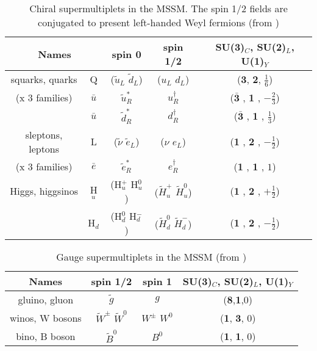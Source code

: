\begin{table}[h]
	\centering
	\begin{tabular}{|c|c|c|c|c|}\hline
\multicolumn{2}{|c|}{Names} & spin 0 & spin 1/2 & SU(3)$_C$, SU(2)$_L$, U(1)$_Y$\\ \hline \hline
squarks, quarks & Q & ($\tilde{u}_L$ $\tilde{d}_L$) & ($u_L$ $d_L$) & (\textbf{3}, \textbf{2}, $\frac{1}{6}$)\\
(x 3 families) & $\bar{u}$ & $\tilde{u}^{*}_R$  & $u_R^\dagger$ &  (\textbf{$\bar{\textbf{3}}$} , \textbf{1} , {$- \frac{2}{3}$})\\
 & $\bar{u}$ & $\tilde{d}^{*}_R$  & $d_R^\dagger$ &  (\textbf{$\bar{\textbf{3}}$} , \textbf{1} , \small{$ \frac{1}{3}$})\\ \hline
 sleptons, leptons & L & ($\tilde{\nu}$ $\tilde{e}_L$) & ($\nu$ $e_L$) & (\textbf{1} , \textbf{2} , \small{$- \frac{1}{2}$}) \\
 (x 3 families) & $\bar{e}$ & $\tilde{e}^{*}_R$ & $e_R^\dagger$  & (\textbf{1} , \textbf{1} , {$ 1$}) \\ \hline
 Higgs, higgsinos & H$_u$ & (H$_u^+$ H$_u^0$) & ($\tilde{H}_u^+$ $\tilde{H}_u^0$)&  (\textbf{1} , \textbf{2} , {$ +\frac{1}{2}$})\\
 &  H$_d$& (H$_d^0$  H$_d^-$) & ($\tilde{H}_d^0$  $\tilde{H}_d^-$) & (\textbf{1} , \textbf{2} , $ -\frac{1}{2}$) \\ \hline
	\end{tabular}
\caption{Chiral supermultiplets in the MSSM. The spin 1/2 fields are conjugated to present left-handed Weyl fermions (from \cite{SUSYPrimer}) \label{tab:theory:chiralsupermultiplets} }
\end{table}

\begin{table}[h]
\centering
\begin{tabular}{|c|c|c|c|}\hline
	Names & spin 1/2 & spin 1 & SU(3)$_C$, SU(2)$_L$, U(1)$_Y$\\ \hline \hline
	gluino, gluon & $\tilde{g}$ & $g$ &  (\textbf{8},\textbf{1},0) \\
	winos, W bosons & $\tilde{W}^\pm$   $\tilde{W}^0$ & $W^\pm$  $W^0$ & (\textbf{1}, \textbf{3}, 0)\\
	bino, B boson &  $\tilde{B}^0$ & $B^0$ &(\textbf{1}, \textbf{1}, 0) \\ \hline
	\end{tabular}
\caption{Gauge supermultiplets in the MSSM  (from \cite{SUSYPrimer}) \label{tab:theory:gaugesupermultiplets} }
\end{table}	


